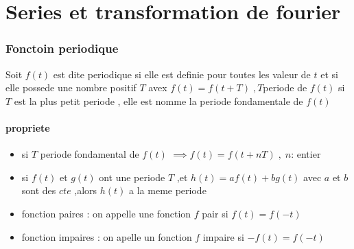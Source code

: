\documentclass[12pt]{book}
\begin{document}
    \chapter{Series et transformation de fourier}
        \subsection*{Fonctoin periodique}
            Soit $f(t)$ est dite periodique si elle est definie pour toutes les valeur de $t$
                et si elle possede une nombre positif $T$ avex $f(t) = f(t+T)\; , T $periode de $f(t)$
                si $T$ est la plus petit periode , elle est nomme la periode fondamentale de $f(t)$
            \subsubsection*{propriete}
                \begin{itemize}
                    \item si $T$ periode fondamental de $f(t)$ $\implies f(t) = f(t+nT) \; , \; n$: entier
                    \item si $f(t)$ et $g(t)$ ont une periode $T$ ,et $h(t) = af(t)+bg(t)$ avec $ a $ et $b$ sont des $cte$ ,alors $h(t)$ a la meme periode 
                    \item fonction paires : on appelle une fonction $f$ pair si $f(t) = f(-t)$
                    \item fonction impaires : on apelle un fonction $f$ impaire si $-f(t) = f(-t)$
                \end{itemize}
\end{document}
